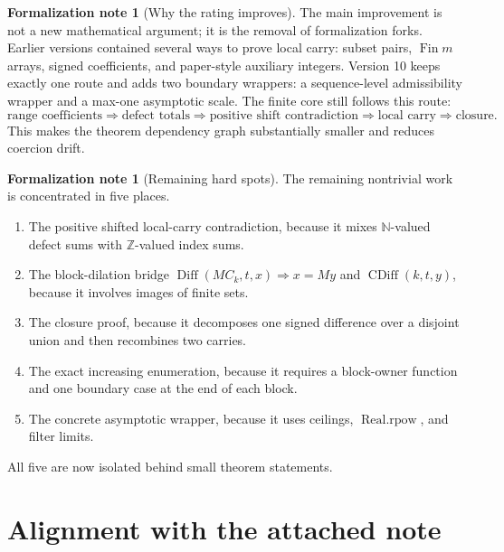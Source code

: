 \documentclass[11pt]{article}
\theoremstyle{definition}
\newtheorem{formalnote}[definition]{Formalization note}
\theoremstyle{plain}
\theoremstyle{remark}
\newcommand{\N}{\mathbb{N}}
\newcommand{\Z}{\mathbb{Z}}
\newcommand{\Diff}{\operatorname{Diff}}
\newcommand{\CDiff}{\operatorname{CDiff}}
\begin{document}
\begin{formalnote}[Why the rating improves]
The main improvement is not a new mathematical argument; it is the removal of formalization forks.  Earlier versions contained several ways to prove local carry: subset pairs, \(\operatorname{Fin} m\) arrays, signed coefficients, and paper-style auxiliary integers.  Version 10 keeps exactly one route and adds two boundary wrappers: a sequence-level admissibility wrapper and a max-one asymptotic scale.  The finite core still follows this route:
\[
\text{range coefficients}\Rightarrow
\text{defect totals}\Rightarrow
\text{positive shift contradiction}\Rightarrow
\text{local carry}\Rightarrow
\text{closure}.
\]
This makes the theorem dependency graph substantially smaller and reduces coercion drift.
\end{formalnote}

\begin{formalnote}[Remaining hard spots]
The remaining nontrivial work is concentrated in five places.
\begin{enumerate}[label=(\arabic*), leftmargin=*]
\item The positive shifted local-carry contradiction, because it mixes \(\N\)-valued defect sums with \(\Z\)-valued index sums.
\item The block-dilation bridge \(\Diff(MC_k,t,x)\Rightarrow x=M y\) and \(\CDiff(k,t,y)\), because it involves images of finite sets.
\item The closure proof, because it decomposes one signed difference over a disjoint union and then recombines two carries.
\item The exact increasing enumeration, because it requires a block-owner function and one boundary case at the end of each block.
\item The concrete asymptotic wrapper, because it uses ceilings, \(\operatorname{Real.rpow}\), and filter limits.
\end{enumerate}
All five are now isolated behind small theorem statements.
\end{formalnote}

\section{Alignment with the attached note}
\end{document}
